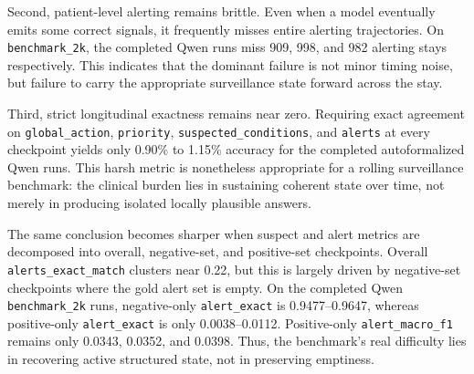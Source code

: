Second, patient-level alerting remains brittle. Even when a model eventually emits some correct signals, it frequently misses entire alerting trajectories. On \texttt{benchmark\_2k}, the completed Qwen runs miss 909, 998, and 982 alerting stays respectively. This indicates that the dominant failure is not minor timing noise, but failure to carry the appropriate surveillance state forward across the stay.

Third, strict longitudinal exactness remains near zero. Requiring exact agreement on \texttt{global\_action}, \texttt{priority}, \texttt{suspected\_conditions}, and \texttt{alerts} at every checkpoint yields only 0.90\% to 1.15\% accuracy for the completed autoformalized Qwen runs. This harsh metric is nonetheless appropriate for a rolling surveillance benchmark: the clinical burden lies in sustaining coherent state over time, not merely in producing isolated locally plausible answers.

The same conclusion becomes sharper when suspect and alert metrics are decomposed into overall, negative-set, and positive-set checkpoints. Overall \texttt{alerts\_exact\_match} clusters near 0.22, but this is largely driven by negative-set checkpoints where the gold alert set is empty. On the completed Qwen \texttt{benchmark\_2k} runs, negative-only \texttt{alert\_exact} is 0.9477--0.9647, whereas positive-only \texttt{alert\_exact} is only 0.0038--0.0112. Positive-only \texttt{alert\_macro\_f1} remains only 0.0343, 0.0352, and 0.0398. Thus, the benchmark's real difficulty lies in recovering active structured state, not in preserving emptiness.

